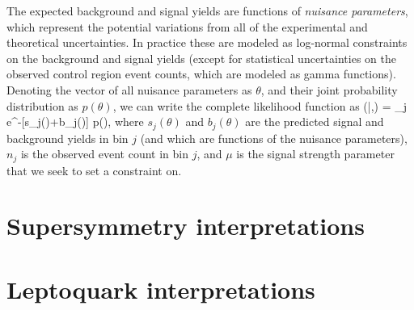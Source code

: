 The expected background and signal yields are functions of \textit{nuisance parameters}, which represent
the potential variations from all of the experimental and theoretical uncertainties. In practice these
are modeled as log-normal constraints on the background and signal yields (except for statistical uncertainties
on the observed control region event counts, which are modeled as gamma functions). Denoting the vector
of all nuisance parameters as $\theta$, and their joint probability distribution as $p(\theta)$, we can write
the complete likelihood function as
\be
{}(|\mu,\theta) = \prod_{j\in{}} 
e^{-[\mu s_j(\theta)+b_j(\theta)]} p(\theta),
\ee
where $s_j(\theta)$ and $b_j(\theta)$ are the predicted signal and background yields in bin $j$ (and which are functions
of the nuisance parameters), $n_j$ is the observed event count in bin $j$, and $\mu$ is the signal strength parameter
that we seek to set a constraint on.

\section{Supersymmetry interpretations}
\label{sec:susy_interp}

\section{Leptoquark interpretations}
\label{sec:lq_interp}
